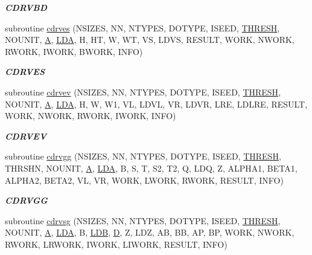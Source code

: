 \begin{DoxyCompactItemize}
\begin{DoxyCompactList}\small\item\em {\bfseries C\+D\+R\+V\+B\+D} \end{DoxyCompactList}\item 
subroutine \hyperlink{group__complex__eig_ga7a71405b6c399d8003237c6dd21b3855}{cdrves} (N\+S\+I\+Z\+E\+S, N\+N, N\+T\+Y\+P\+E\+S, D\+O\+T\+Y\+P\+E, I\+S\+E\+E\+D, \hyperlink{zlaqgs_8c_a0656018abfc9fa2821827415f5d5ea57}{T\+H\+R\+E\+S\+H}, N\+O\+U\+N\+I\+T, \hyperlink{classA}{A}, \hyperlink{example__user_8c_ae946da542ce0db94dced19b2ecefd1aa}{L\+D\+A}, H, H\+T, W, W\+T, V\+S, L\+D\+V\+S, R\+E\+S\+U\+L\+T, W\+O\+R\+K, N\+W\+O\+R\+K, R\+W\+O\+R\+K, I\+W\+O\+R\+K, B\+W\+O\+R\+K, I\+N\+F\+O)
\begin{DoxyCompactList}\small\item\em {\bfseries C\+D\+R\+V\+E\+S} \end{DoxyCompactList}\item 
subroutine \hyperlink{group__complex__eig_ga83586dc59c82790361b0de5fe25bf0f3}{cdrvev} (N\+S\+I\+Z\+E\+S, N\+N, N\+T\+Y\+P\+E\+S, D\+O\+T\+Y\+P\+E, I\+S\+E\+E\+D, \hyperlink{zlaqgs_8c_a0656018abfc9fa2821827415f5d5ea57}{T\+H\+R\+E\+S\+H}, N\+O\+U\+N\+I\+T, \hyperlink{classA}{A}, \hyperlink{example__user_8c_ae946da542ce0db94dced19b2ecefd1aa}{L\+D\+A}, H, W, W1, V\+L, L\+D\+V\+L, V\+R, L\+D\+V\+R, L\+R\+E, L\+D\+L\+R\+E, R\+E\+S\+U\+L\+T, W\+O\+R\+K, N\+W\+O\+R\+K, R\+W\+O\+R\+K, I\+W\+O\+R\+K, I\+N\+F\+O)
\begin{DoxyCompactList}\small\item\em {\bfseries C\+D\+R\+V\+E\+V} \end{DoxyCompactList}\item 
subroutine \hyperlink{group__complex__eig_ga6d4d21e3f556cbcb6998be9aeede7151}{cdrvgg} (N\+S\+I\+Z\+E\+S, N\+N, N\+T\+Y\+P\+E\+S, D\+O\+T\+Y\+P\+E, I\+S\+E\+E\+D, \hyperlink{zlaqgs_8c_a0656018abfc9fa2821827415f5d5ea57}{T\+H\+R\+E\+S\+H}, T\+H\+R\+S\+H\+N, N\+O\+U\+N\+I\+T, \hyperlink{classA}{A}, \hyperlink{example__user_8c_ae946da542ce0db94dced19b2ecefd1aa}{L\+D\+A}, B, S, T, S2, T2, Q, L\+D\+Q, Z, A\+L\+P\+H\+A1, B\+E\+T\+A1, A\+L\+P\+H\+A2, B\+E\+T\+A2, V\+L, V\+R, W\+O\+R\+K, L\+W\+O\+R\+K, R\+W\+O\+R\+K, R\+E\+S\+U\+L\+T, I\+N\+F\+O)
\begin{DoxyCompactList}\small\item\em {\bfseries C\+D\+R\+V\+G\+G} \end{DoxyCompactList}\item 
subroutine \hyperlink{group__complex__eig_ga00458f67544e6b941bb4b947d54e239f}{cdrvsg} (N\+S\+I\+Z\+E\+S, N\+N, N\+T\+Y\+P\+E\+S, D\+O\+T\+Y\+P\+E, I\+S\+E\+E\+D, \hyperlink{zlaqgs_8c_a0656018abfc9fa2821827415f5d5ea57}{T\+H\+R\+E\+S\+H}, N\+O\+U\+N\+I\+T, \hyperlink{classA}{A}, \hyperlink{example__user_8c_ae946da542ce0db94dced19b2ecefd1aa}{L\+D\+A}, B, \hyperlink{example__user_8c_a50e90a7104df172b5a89a06c47fcca04}{L\+D\+B}, \hyperlink{odrpack_8h_a7dae6ea403d00f3687f24a874e67d139}{D}, Z, L\+D\+Z, A\+B, B\+B, A\+P, B\+P, W\+O\+R\+K, N\+W\+O\+R\+K, R\+W\+O\+R\+K, L\+R\+W\+O\+R\+K, I\+W\+O\+R\+K, L\+I\+W\+O\+R\+K, R\+E\+S\+U\+L\+T, I\+N\+F\+O)

\end{DoxyCompactItemize}
